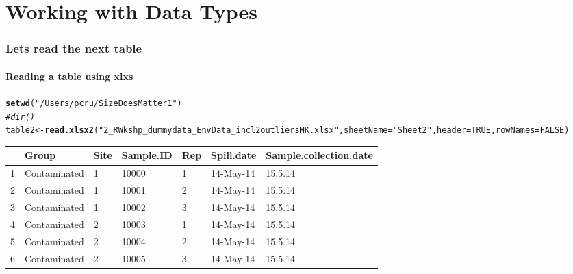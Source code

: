 \documentclass{article}\usepackage[]{graphicx}\usepackage[]{color}
\makeatletter
\newcommand{\hlnum}[1]{\textcolor[rgb]{0.686,0.059,0.569}{#1}}%
\newcommand{\hlstr}[1]{\textcolor[rgb]{0.192,0.494,0.8}{#1}}%
\newcommand{\hlcom}[1]{\textcolor[rgb]{0.678,0.584,0.686}{\textit{#1}}}%
\newcommand{\hlstd}[1]{\textcolor[rgb]{0.345,0.345,0.345}{#1}}%
\newcommand{\hlkwb}[1]{\textcolor[rgb]{0.69,0.353,0.396}{#1}}%
\newcommand{\hlkwc}[1]{\textcolor[rgb]{0.333,0.667,0.333}{#1}}%
\newcommand{\hlkwd}[1]{\textcolor[rgb]{0.737,0.353,0.396}{\textbf{#1}}}%
\newenvironment{kframe}{%
 \def\at@end@of@kframe{}%
 \ifinner\ifhmode%
  \def\at@end@of@kframe{\end{minipage}}%
  \begin{minipage}{\columnwidth}%
 \fi\fi%
 \def\FrameCommand##1{\hskip\@totalleftmargin \hskip-\fboxsep
 \colorbox{shadecolor}{##1}\hskip-\fboxsep
     \hskip-\linewidth \hskip-\@totalleftmargin \hskip\columnwidth}%
 \MakeFramed {\advance\hsize-\width
   \@totalleftmargin\z@ \linewidth\hsize
   \@setminipage}}%
 {\par\unskip\endMakeFramed%
 \at@end@of@kframe}
\newenvironment{knitrout}{}{} %
\makeatother
\begin{document}
\section*{Working with Data Types}
\begin{frame}[fragile]
  \frametitle{Lets read the next table}
  \framesubtitle{Reading a table using xlxs}
\begin{knitrout}
\color{fgcolor}\begin{kframe}
\begin{alltt}
\hlkwd{setwd}\hlstd{(}\hlstr{"/Users/pcru/SizeDoesMatter1"}\hlstd{)}
\hlcom{#dir()}
\hlstd{table2}\hlkwb{<-}\hlkwd{read.xlsx2}\hlstd{(}\hlstr{"2_R Wkshp_dummy data_Env Data_incl2outliersMK.xlsx"}\hlstd{,} \hlkwc{sheetName} \hlstd{=}\hlstr{"Sheet2"}\hlstd{,}\hlkwc{header}\hlstd{=}\hlnum{TRUE}\hlstd{,}\hlkwc{rowNames}\hlstd{=}\hlnum{FALSE}\hlstd{)}
\end{alltt}
\end{kframe}
\end{knitrout}
\begin{table}[ht]
\centering
\begin{tabular}{rllllll}
  \hline
 & Group & Site & Sample.ID & Rep & Spill.date & Sample.collection.date \\ 
  \hline
1 & Contaminated & 1 & 10000 & 1 & 14-May-14 & 15.5.14 \\ 
  2 & Contaminated & 1 & 10001 & 2 & 14-May-14 & 15.5.14 \\ 
  3 & Contaminated & 1 & 10002 & 3 & 14-May-14 & 15.5.14 \\ 
  4 & Contaminated & 2 & 10003 & 1 & 14-May-14 & 15.5.14 \\ 
  5 & Contaminated & 2 & 10004 & 2 & 14-May-14 & 15.5.14 \\ 
  6 & Contaminated & 2 & 10005 & 3 & 14-May-14 & 15.5.14 \\ 
   \hline
\end{tabular}
\end{table}

\clearpage
\end{frame}
\end{document}
